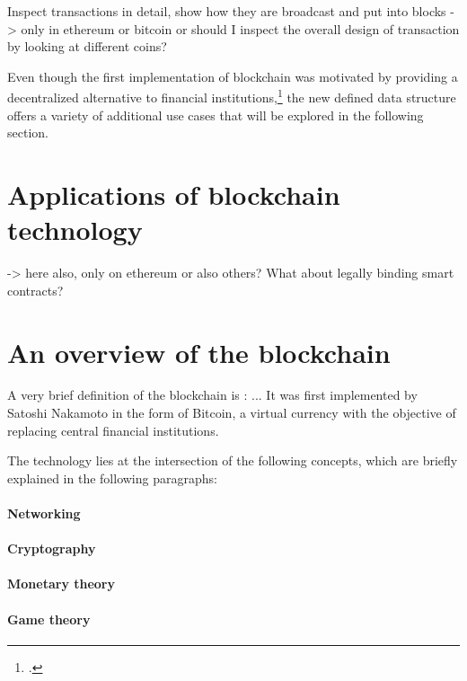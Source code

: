 Inspect transactions in detail, show how they are broadcast and put into blocks
-> only in ethereum or bitcoin or should I inspect the overall design of transaction by looking at different coins?

Even though the first implementation of blockchain was motivated by providing a decentralized alternative to financial institutions,\footcite[Cf.][p.2]{Nakamoto.2008} the new defined data structure offers a variety of additional use cases that will be explored in the following section.

\section{Applications of blockchain technology} \label{sec:SmartContracts}

-> here also, only on ethereum or also others? What about legally binding smart contracts?




\section{An overview of the blockchain}
A very brief definition of the blockchain is : ... It was first implemented by Satoshi Nakamoto in the form of Bitcoin, a virtual currency with the objective of replacing central financial institutions.

The technology lies at the intersection of the following concepts, which are briefly explained in the following paragraphs:

\paragraph{Networking}
\paragraph{Cryptography}
\paragraph{Monetary theory}
\paragraph{Game theory}
